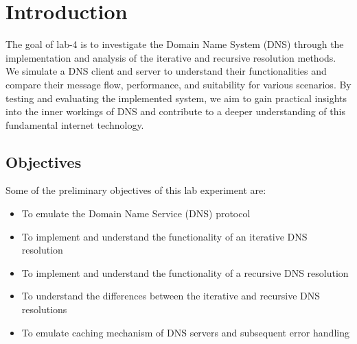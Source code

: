 \documentclass[11pt]{article}
\begin{document}
\section{Introduction}
The goal of lab-4 is to investigate the Domain Name System (DNS) through the implementation 
and analysis of the iterative and recursive resolution methods. We simulate a DNS client and
server to understand their functionalities and compare their message flow, performance, and
suitability for various scenarios. By testing and evaluating the implemented system, we aim
to gain practical insights into the inner workings of DNS and contribute to a deeper
understanding of this fundamental internet technology.
\subsection{Objectives}
Some of the preliminary objectives of this lab experiment are:
\begin{itemize}
    \item To emulate the Domain Name Service (DNS) protocol
    \item To implement and understand the functionality of an iterative DNS resolution
    \item To implement and understand the functionality of a recursive DNS resolution
    \item To understand the differences between the iterative and recursive DNS resolutions
    \item To emulate caching mechanism of DNS servers and subsequent error handling
\end{itemize}
\end{document}
